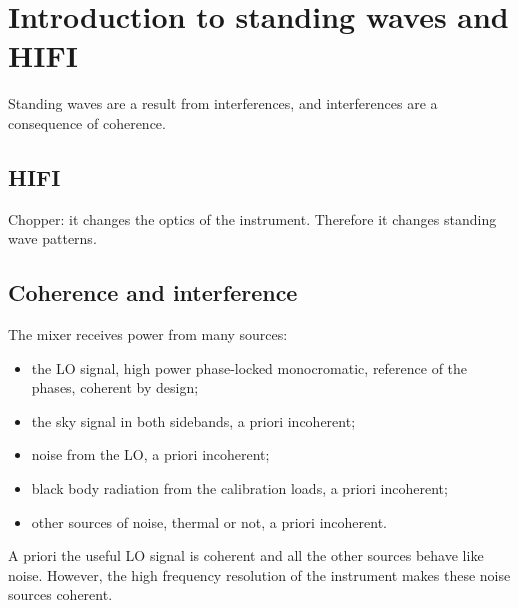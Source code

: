 \cleardoublepage
\chapter{Introduction to standing waves and HIFI}
Standing waves are a result from interferences, and interferences are a consequence of coherence.

\section{HIFI}
Chopper: it changes the optics of the instrument.  Therefore it changes standing wave patterns.  

\section{Coherence and interference}
The mixer receives power from many sources:
\begin{itemize}
    \item the LO signal, high power phase-locked monocromatic, reference of the phases, coherent by design;
    \item the sky signal in both sidebands, a priori incoherent;
    \item noise from the LO, a priori incoherent;
    \item black body radiation from the calibration loads, a priori incoherent;
    \item other sources of noise, thermal or not, a priori incoherent.
\end{itemize}
A priori the useful LO signal is coherent and all the other sources behave like noise.
However, the high frequency resolution of the instrument makes these noise sources coherent.


